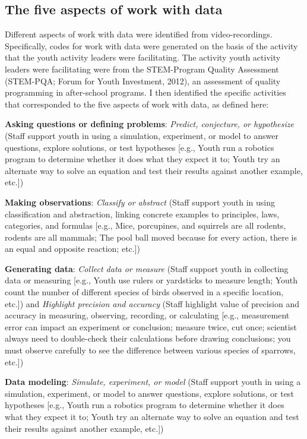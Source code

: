 \documentclass[]{msu-thesis}
\theoremstyle{definition}
\theoremstyle{definition}
\theoremstyle{definition}
\theoremstyle{remark}
\begin{document}
\subsection{The five aspects of work with
data}\label{the-five-aspects-of-work-with-data}

Different aspects of work with data were identified from
video-recordings. Specifically, codes for work with data were generated
on the basis of the activity that the youth activity leaders were
facilitating. The activity youth activity leaders were facilitating were
from the STEM-Program Quality Assessment (STEM-PQA; Forum for Youth
Investment, 2012), an assessment of quality programming in after-school
programs. I then identified the specific activities that corresponded to
the five aspects of work with data, as defined here:

\textbf{Asking questions or defining problems}: \emph{Predict,
conjecture, or hypothesize} (Staff support youth in using a simulation,
experiment, or model to answer questions, explore solutions, or test
hypotheses {[}e.g., Youth run a robotics program to determine whether it
does what they expect it to; Youth try an alternate way to solve an
equation and test their results against another example, etc.{]})

\textbf{Making observations}: \emph{Classify or abstract} (Staff support
youth in using classification and abstraction, linking concrete examples
to principles, laws, categories, and formulas {[}e.g., Mice, porcupines,
and squirrels are all rodents, rodents are all mammals; The pool ball
moved because for every action, there is an equal and opposite reaction;
etc.{]})

\textbf{Generating data}: \emph{Collect data or measure} (Staff support
youth in collecting data or measuring {[}e.g., Youth use rulers or
yardsticks to measure length; Youth count the number of different
species of birds observed in a specific location, etc.{]}) and
\emph{Highlight precision and accuracy} (Staff highlight value of
precision and accuracy in measuring, observing, recording, or
calculating {[}e.g., measurement error can impact an experiment or
conclusion; measure twice, cut once; scientist always need to
double-check their calculations before drawing conclusions; you must
observe carefully to see the difference between various species of
sparrows, etc.{]})

\textbf{Data modeling}: \emph{Simulate, experiment, or model} (Staff
support youth in using a simulation, experiment, or model to answer
questions, explore solutions, or test hypotheses {[}e.g., Youth run a
robotics program to determine whether it does what they expect it to;
Youth try an alternate way to solve an equation and test their results
against another example, etc.{]})
\end{document}
